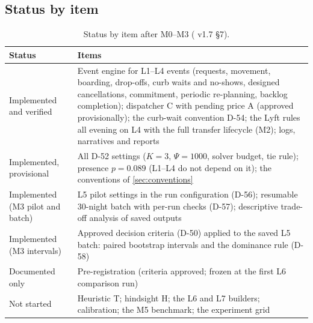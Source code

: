 \documentclass[11pt,letterpaper]{article}
\DeclareRobustCommand{\fn}[1]{\texttt{\detokenize{#1}}}
\newcommand{\D}[1]{D-#1}
\begin{document}
\subsection{Status by item}
\begin{table}[H]
\centering\small
\caption{Status by item after M0--M3 (\fn{scenario_methodology.md} v1.7 §7).}\label{tab:statusitems}
\begin{tabularx}{\textwidth}{@{}P{3.6cm}L@{}}
\toprule
\textbf{Status} & \textbf{Items}\\
\midrule
Implemented and verified & Event engine for L1--L4 events (requests, movement, boarding, drop-offs, curb waits and no-shows, designed cancellations, commitment, periodic re-planning, backlog completion); dispatcher C with pending price A (approved provisionally); the curb-wait convention \D{54}; the Lyft rules all evening on L4 with the full transfer lifecycle (M2); logs, narratives and reports\\
Implemented, provisional & All \D{52} settings ($K = 3$, $\Psi = 1000$, solver budget, tie rule); presence $p = 0.089$ (L1--L4 do not depend on it); the conventions of \cref{sec:conventions}\\
Implemented (M3 pilot and batch) & L5 pilot settings in the run configuration (\D{56}); resumable 30-night batch with per-run checks (\D{57}); descriptive trade-off analysis of saved outputs\\
Implemented (M3 intervals) & Approved decision criteria (\D{50}) applied to the saved L5 batch: paired bootstrap intervals and the dominance rule (\D{58})\\
Documented only & Pre-registration (criteria approved; frozen at the first L6 comparison run)\\
Not started & Heuristic T; hindsight H; the L6 and L7 builders; calibration; the M5 benchmark; the experiment grid\\
\bottomrule
\end{tabularx}
\end{table}
\end{document}
